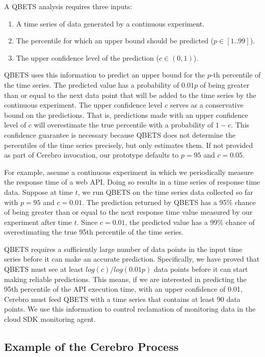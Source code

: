 A QBETS analysis requires three inputs:
\begin{enumerate}
\item A time series of data generated by a continuous experiment.
\item The percentile for which an upper bound should be predicted ($p \in [1..99]$).
\item The upper confidence level of the prediction ($c \in (0,1)$).
\end{enumerate}

QBETS uses this information to predict an upper bound for 
the $p$-th percentile of the time series.
The predicted value has a probability of $0.01p$ of 
being greater than or equal to the next data point that
will be added to the time series by the continuous experiment. 
The upper confidence level $c$ serves as a conservative
bound on the predictions. That is, predictions made with an upper confidence 
level of $c$ will overestimate
the true percentile with a probability of $1-c$. This confidence guarantee 
is necessary because QBETS does not determine the 
percentiles of the time series precisely, but only estimates them. 
If not provided as part of Cerebro invocation, our prototype 
defaults to $p=95$ and $c=0.05$. 

For example, assume a continuous experiment 
in which we periodically measure the
response time of a web API. Doing so results in a time series of 
response time data. Suppose at time $t$,
we run QBETS on the time series data collected so far 
with $p=95$ and $c=0.01$. The prediction returned
by QBETS has a 95\% chance of being greater than or equal 
to the next response time value measured
by our experiment after time $t$. Since $c=0.01$, the predicted value has a 99\% chance of
overestimating the true 95th percentile of the time series.

QBETS requires a sufficiently large number of data points
in the input time series before it can make an accurate prediction. 
Specifically, we have proved that QBETS must see 
at least $log(c)/log(0.01p)$ data points
before it can start making reliable predictions. 
This means, if we are interested in predicting the 95th percentile
of the API execution time, with an upper confidence of 0.01, 
Cerebro must feed QBETS with a time series that
contains at least 90 data points. We use this information to control 
reclamation of monitoring data in the cloud SDK monitoring agent.

\subsection{Example of the Cerebro Process}

